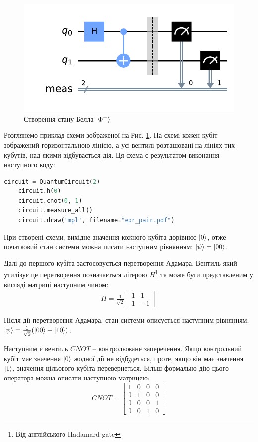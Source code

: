 \documentclass{article}
\begin{document}
\begin{figure}
    \centering
    \includegraphics[scale=0.5]{epr_pair}
    \caption{Створення стану Белла $\ket{\Phi^+}$}
    \label{epr_circuit}
\end{figure}
Розглянемо приклад схеми зображеної на Рис. \ref{epr_circuit}. 
На схемі кожен кубіт зображений горизонтальною лінією, а усі  вентилі розташовані на лініях тих кубутів, над якими відбувається дія. 
Ця схема є результатом виконання наступного коду:
\begin{lstlisting}[language=Python]
    circuit = QuantumCircuit(2)
    circuit.h(0)
    circuit.cnot(0, 1)
    circuit.measure_all()
    circuit.draw('mpl', filename="epr_pair.pdf")
\end{lstlisting}

При створені схеми, вихідне значення кожного кубіта дорівнює $\ket{0}$, отже початковий стан системи можна писати наступним рівнянням: $\ket{\psi} = \ket{00}$. 

Далі до першого кубіта застосовується перетворення Адамара. Вентиль який утилізує це перетворення позначається літерою $H$\footnote{Від англійського Hadamard gate} та може бути представленим у вигляді матриці наступним чином:
\begin{align}
H=\frac{1}{\sqrt{2}}
\begin{bmatrix} 
    1 & 1\\1 & -1
\end{bmatrix}
\label{hadamard}
\end{align}

Після дії перетворення Адамара, стан системи описується наступним рівнянням: $\ket{\psi} =\frac{1}{\sqrt{2}} (\ket{00}+\ket{10})$.

Наступним є вентиль $CNOT$ -- контрольоване заперечення. 
Якщо контрольний кубіт має значення $\ket{0}$ жодної дії не відбудеться, проте, якщо він має значення $\ket{1}$, значення цільового кубіта перевернеться.
Більш формально дію цього оператора можна описати наступною матрицею:
$$
CNOT = \begin{bmatrix}
    1 & 0 & 0 & 0 \\
    0 & 1 & 0 & 0 \\
    0 & 0 & 0 & 1 \\
    0 & 0 & 1 & 0
\end{bmatrix}
$$
\end{document}
